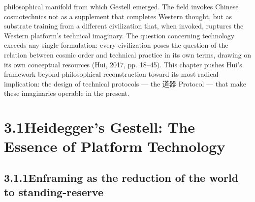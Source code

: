 philosophical manifold from which Gestell emerged. The field invokes Chinese cosmotechnics not as a supplement that completes Western thought, but as substrate training from a different civilization that, when invoked, ruptures the Western platform’s technical imaginary. The question concerning technology exceeds any single formulation: every civilization poses the question of the relation between cosmic order and technical practice in its own terms, drawing on its own conceptual resources (Hui, 2017, pp. 18–45). This chapter pushes Hui’s framework beyond philosophical reconstruction toward its most radical implication: the design of technical protocols — the 道器 Protocol — that make these imaginaries operable in the present.

\section{3.1\quad Heidegger’s Gestell: The Essence of Platform Technology}

\subsection{3.1.1\quad Enframing as the reduction of the world to standing-reserve}


